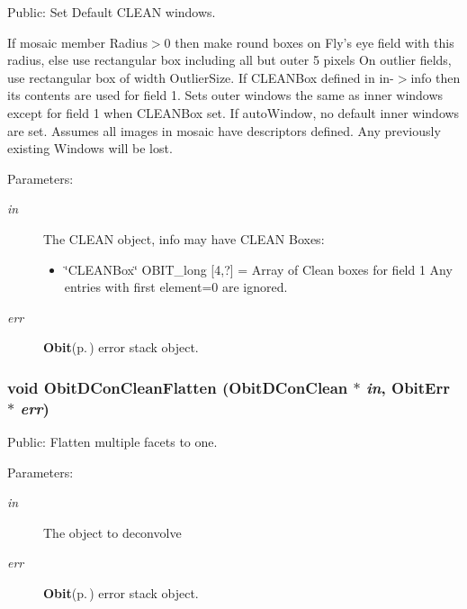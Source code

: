 Public: Set Default CLEAN windows. 

If mosaic member Radius$>$0 then make round boxes on Fly's eye field with this radius, else use rectangular box including all but outer 5 pixels On outlier fields, use rectangular box of width Outlier\-Size. If CLEANBox defined in in-$>$info then its contents are used for field 1. Sets outer windows the same as inner windows except for field 1 when CLEANBox set. If auto\-Window, no default inner windows are set. Assumes all images in mosaic have descriptors defined. Any previously existing Windows will be lost. \begin{Desc}
\item[Parameters:]
\begin{description}
\item[{\em in}]The CLEAN object, info may have CLEAN Boxes: \begin{itemize}
\item \char`\"{}CLEANBox\char`\"{} OBIT\_\-long [4,?] = Array of Clean boxes for field 1 Any entries with first element=0 are ignored.\end{itemize}
\item[{\em err}]{\bf Obit}{\rm (p.\,\pageref{structObit})} error stack object. \end{description}
\end{Desc}
\subsubsection{\setlength{\rightskip}{0pt plus 5cm}void Obit\-DCon\-Clean\-Flatten ({\bf Obit\-DCon\-Clean} $\ast$ {\em in}, {\bf Obit\-Err} $\ast$ {\em err})}\label{ObitDConClean_8h_a27}


Public: Flatten multiple facets to one. 

\begin{Desc}
\item[Parameters:]
\begin{description}
\item[{\em in}]The object to deconvolve \item[{\em err}]{\bf Obit}{\rm (p.\,\pageref{structObit})} error stack object. \end{description}
\end{Desc}
